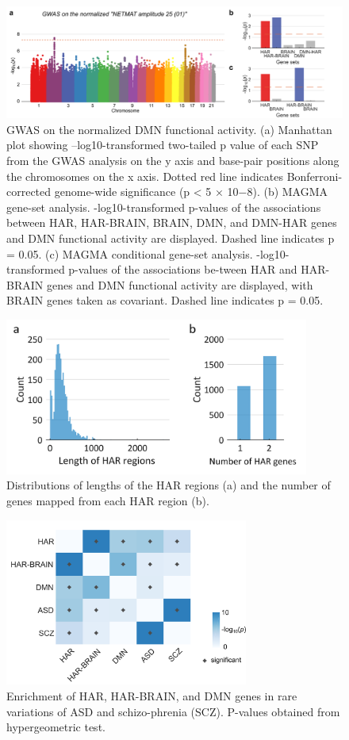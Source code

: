 \begin{refsection}
\begin{figure}[H]
    \centering
    \includegraphics[width=\linewidth]{images/harFigS7.png}
    \caption{GWAS on the normalized DMN functional activity. (a) Manhattan plot showing –log10-transformed two-tailed p value of each SNP from the GWAS analysis on the y axis and base-pair positions along the chromosomes on the x axis. Dotted red line indicates Bonferroni-corrected genome-wide significance (p < 5 × 10−8). (b) MAGMA gene-set analysis. -log10-transformed p-values of the associations between HAR, HAR-BRAIN, BRAIN, DMN, and DMN-HAR genes and DMN functional activity are displayed. Dashed line indicates p = 0.05. (c) MAGMA conditional gene-set analysis. -log10-transformed p-values of the associations be-tween HAR and HAR-BRAIN genes and DMN functional activity are displayed, with BRAIN genes taken as covariant. Dashed line indicates p = 0.05.}
    \label{harFigs7}
\end{figure}

\begin{figure}[H]
    \centering
    \includegraphics[width=10cm]{images/harFigS8.png}
    \caption{Distributions of lengths of the HAR regions (a) and the number of genes mapped from each HAR region (b).}
    \label{harFigs8}
\end{figure}

\begin{figure}[H]
    \centering
    \includegraphics[width=8cm]{images/harFigS9.png}
    \caption{Enrichment of HAR, HAR-BRAIN, and DMN genes in rare variations of ASD and schizo-phrenia (SCZ). P-values obtained from hypergeometric test.}
    \label{harFigs9}
\end{figure}


\end{refsection}
